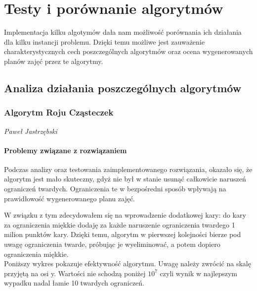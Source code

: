 \chapter{Testy i porównanie algorytmów}
Implementacja kilku algotymów dała nam możliwość porównania ich działania dla kilku instancji problemu. Dzięki temu możliwe jest zauważenie charakterystycznych cech poszczególnych algorytmów oraz ocena wygenerowanych planów zajęć przez te algorytmy.
\section{Analiza działania poszczególnych algorytmów}
\subsection{Algorytm Roju Cząsteczek}
\textit{Paweł Jastrzębski} \\
\subsubsection{Problemy związane z rozwiązaniem}
\par Podczas analizy oraz testowania zaimplementowanego rozwiązania, okazało się, że algorytm jest mało skuteczny, gdyż nie był w stanie usunąć całkowicie naruszeń ograniczeń twardych. Ograniczenia te w bezpośredni sposób wpływają na prawidłowość wygenerowanego planu zajęć.
\par W związku z tym zdecydowałem się na wprowadzenie dodatkowej kary: do kary za ograniczenia miękkie dodaję za każde naruszenie ograniczenia twardego 1 milion punktów kary. Dzięki temu, algorytm w pierwszej kolejności bierze pod uwagę ograniczenia twarde, próbując je wyeliminować, a potem dopiero ograniczenia miękkie. \\

Poniższy wykres pokazuje efektywność algorytmu. Uwagę należy zwrócić na skalę przyjętą na osi y. Wartości nie schodzą poniżej $10^{7}$ czyli wynik w najlepszym wypadku nadal łamie 10 twardych ograniczeń.

